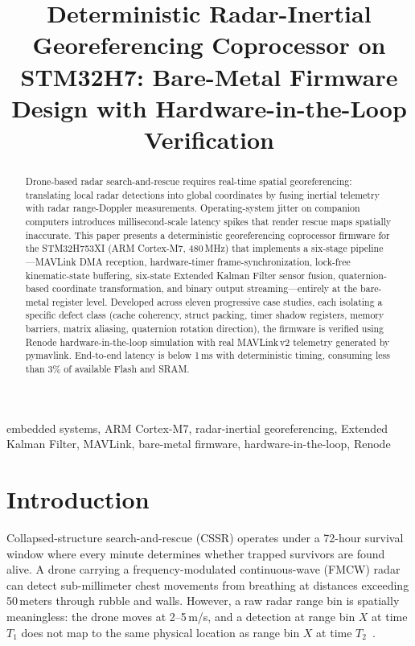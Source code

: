 \documentclass[conference,a4paper]{IEEEtran}
\title{Deterministic Radar-Inertial Georeferencing Coprocessor on STM32H7: Bare-Metal Firmware Design with Hardware-in-the-Loop Verification}
\author{
\IEEEauthorblockN{Ganesh H.\,V.}
\IEEEauthorblockA{Department of Electronics and Communication Engineering\\
National Institute of Technology\\
Email: ganesh.h.v@ieee.org}
}
\begin{document}
\maketitle

\begin{abstract}
Drone-based radar search-and-rescue requires real-time spatial georeferencing: translating local radar detections into global coordinates by fusing inertial telemetry with radar range-Doppler measurements. Operating-system jitter on companion computers introduces millisecond-scale latency spikes that render rescue maps spatially inaccurate. This paper presents a deterministic georeferencing coprocessor firmware for the STM32H753XI (ARM Cortex-M7, 480\,MHz) that implements a six-stage pipeline---MAVLink DMA reception, hardware-timer frame-synchronization, lock-free kinematic-state buffering, six-state Extended Kalman Filter sensor fusion, quaternion-based coordinate transformation, and binary output streaming---entirely at the bare-metal register level. Developed across eleven progressive case studies, each isolating a specific defect class (cache coherency, struct packing, timer shadow registers, memory barriers, matrix aliasing, quaternion rotation direction), the firmware is verified using Renode hardware-in-the-loop simulation with real MAVLink\,v2 telemetry generated by pymavlink. End-to-end latency is below 1\,ms with deterministic timing, consuming less than 3\% of available Flash and SRAM.
\end{abstract}

\begin{IEEEkeywords}
embedded systems, ARM Cortex-M7, radar-inertial georeferencing, Extended Kalman Filter, MAVLink, bare-metal firmware, hardware-in-the-loop, Renode
\end{IEEEkeywords}

\section{Introduction}
\label{sec:introduction}

Collapsed-structure search-and-rescue (CSSR) operates under a 72-hour survival window where every minute determines whether trapped survivors are found alive. A drone carrying a frequency-modulated continuous-wave (FMCW) radar can detect sub-millimeter chest movements from breathing at distances exceeding 50\,meters through rubble and walls. However, a raw radar range bin is spatially meaningless: the drone moves at 2--5\,m/s, and a detection at range bin $X$ at time $T_1$ does not map to the same physical location as range bin $X$ at time $T_2$~\cite{thrun2005}.
\end{document}
